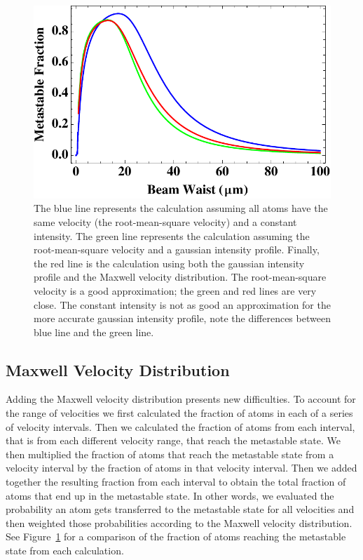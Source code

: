 \documentclass[prb,preprint]{revtex4-1}
\begin{document}
\begin{figure}[h!]
\centering
\includegraphics[width=6in]{AllGraph.pdf}
\caption{The blue line represents the calculation assuming all atoms have the same velocity (the root-mean-square velocity) and a constant intensity. The green line represents the calculation assuming the root-mean-square velocity and a gaussian intensity profile. Finally, the red line is the calculation using both the gaussian intensity profile and the Maxwell velocity distribution. The root-mean-square velocity is a good approximation; the green and red lines are very close. The constant intensity is not as good an approximation for the more accurate gaussian intensity profile, note the differences between blue line and the green line.}
\label{AllGraph}
\end{figure}


\subsection{Maxwell Velocity Distribution}

Adding the Maxwell velocity distribution presents new difficulties. To account for the range of velocities we first calculated the fraction of atoms in each of a series of velocity intervals. Then we calculated the fraction of atoms from each interval, that is from each different velocity range, that reach the metastable state. We then multiplied the fraction of atoms that reach the metastable state from a velocity interval by the fraction of atoms in that velocity interval. Then we added together the resulting fraction from each interval to obtain the total fraction of atoms that end up in the metastable state.  In other words, we evaluated the probability an atom gets transferred to the metastable state for all velocities and then weighted those probabilities according to the Maxwell velocity distribution.  See Figure~\ref{AllGraph} for a comparison of the fraction of atoms reaching the metastable state from each calculation.
\end{document}
